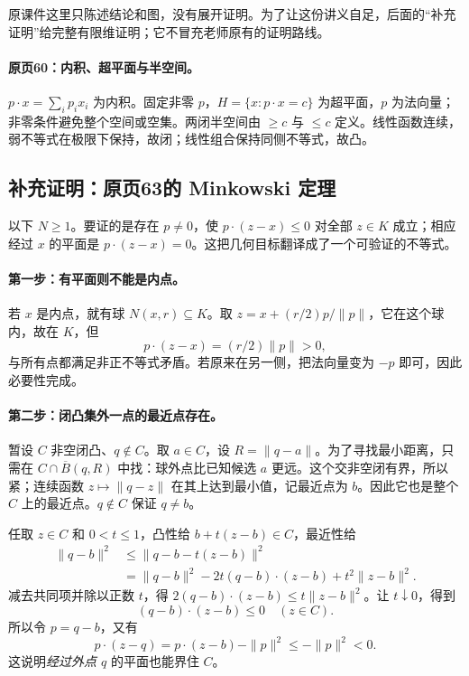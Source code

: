 \documentclass[11pt,a4paper]{article}
\theoremstyle{definition}\newtheorem{definition}{定义}\newtheorem{example}{例}
\begin{document}
原课件这里只陈述结论和图，没有展开证明。为了让这份讲义自足，后面的“补充证明”给完整有限维证明；它不冒充老师原有的证明路线。


\paragraph{原页60：内积、超平面与半空间。}$p\cdot x=\sum_i p_ix_i$ 为内积。固定非零 $p$，$H=\{x:p\cdot x=c\}$ 为超平面，$p$ 为法向量；非零条件避免整个空间或空集。两闭半空间由 $\ge c$ 与 $\le c$ 定义。线性函数连续，弱不等式在极限下保持，故闭；线性组合保持同侧不等式，故凸。




\subsection*{补充证明：原页63的 Minkowski 定理}
以下 $N\ge1$。要证的是存在 $p\ne0$，使 $p\cdot(z-x)\le0$ 对全部 $z\in K$ 成立；相应经过 $x$ 的平面是 $p\cdot(z-x)=0$。这把几何目标翻译成了一个可验证的不等式。

\paragraph{第一步：有平面则不能是内点。}
若 $x$ 是内点，就有球 $N(x,r)\subseteq K$。取 $z=x+(r/2)p/\|p\|$，它在这个球内，故在 $K$，但
\[p\cdot(z-x)=(r/2)\|p\|>0,
\]
与所有点都满足非正不等式矛盾。若原来在另一侧，把法向量变为 $-p$ 即可，因此必要性完成。

\paragraph{第二步：闭凸集外一点的最近点存在。}
暂设 $C$ 非空闭凸、$q\notin C$。取 $a\in C$，设 $R=\|q-a\|$。为了寻找最小距离，只需在 $C\cap\overline B(q,R)$ 中找：球外点比已知候选 $a$ 更远。这个交非空闭有界，所以紧；连续函数 $z\mapsto\|q-z\|$ 在其上达到最小值，记最近点为 $b$。因此它也是整个 $C$ 上的最近点。$q\notin C$ 保证 $q\ne b$。

任取 $z\in C$ 和 $0<t\le1$，凸性给 $b+t(z-b)\in C$，最近性给
\begin{align*}
\|q-b\|^2&\le\|q-b-t(z-b)\|^2\\
&=\|q-b\|^2-2t(q-b)\cdot(z-b)+t^2\|z-b\|^2.
\end{align*}
减去共同项并除以正数 $t$，得 $2(q-b)\cdot(z-b)\le t\|z-b\|^2$。让 $t\downarrow0$，得到
\[(q-b)\cdot(z-b)\le0\quad(z\in C).\tag{*}
\]
所以令 $p=q-b$，又有
\[p\cdot(z-q)=p\cdot(z-b)-\|p\|^2\le-\|p\|^2<0.
\]
这说明\emph{经过外点 $q$} 的平面也能界住 $C$。
\end{document}
